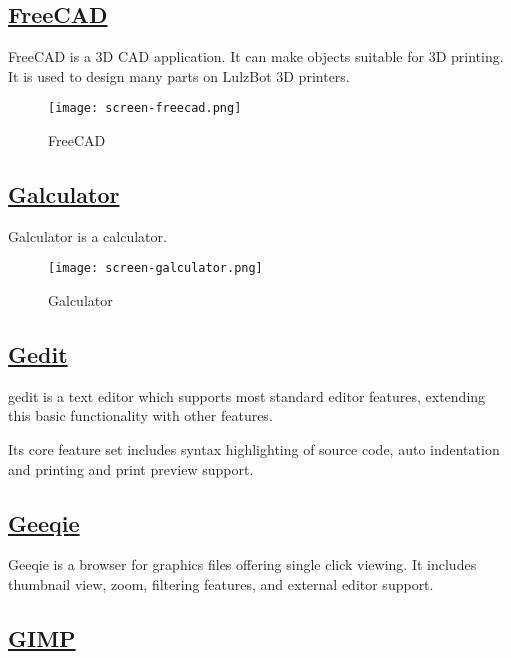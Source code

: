 \subsection{\href{http://freecadweb.org/}{FreeCAD}}

FreeCAD is a 3D CAD application.
It can make objects suitable for 3D printing. It is used to design many
parts on LulzBot 3D printers.

\begin{figure}[h!]
\texttt{[image: screen-freecad.png]}
 \caption{FreeCAD}
 \label{fig:screen-freecad}
\end{figure}

\subsection{\href{http://galculator.sourceforge.net/}{Galculator}}

 Galculator is a calculator.

\begin{figure}[h!]
\texttt{[image: screen-galculator.png]}
 \caption{Galculator}
 \label{fig:screen-galculator}
\end{figure}

\subsection{\href{https://wiki.gnome.org/Apps/Gedit}{Gedit}}

 gedit is a text editor which supports most standard editor features,
 extending this basic functionality with other features.
 
 Its core feature set includes syntax
 highlighting of source code, auto indentation and printing and print preview
 support.
 
\subsection{\href{http://geeqie.sourceforge.net/}{Geeqie}}

 Geeqie is a browser for graphics files offering single click viewing.
 It includes thumbnail view, zoom, filtering
 features, and external editor support.

\subsection{\href{http://www.gimp.org/}{GIMP}}

